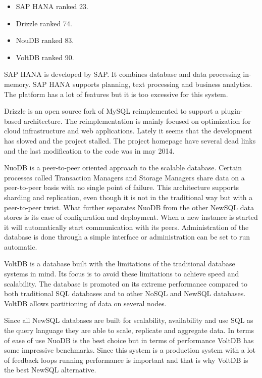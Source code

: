 \begin{itemize}
\item SAP HANA\cite{saphana} ranked 23.
\item Drizzle\cite{drizzle} ranked 74.
\item NouDB\cite{nuodb} ranked 83.
\item VoltDB\cite{voltdb} ranked 90.
\end{itemize}

SAP HANA is developed by SAP.
It combines database and data processing in-memory.
SAP HANA supports planning, text processing and business analytics.
The platform has a lot of features but it is too excessive for this system.

Drizzle is an open source fork of MySQL reimplemented to support a plugin-based architecture.
The reimplementation is mainly focused on optimization for cloud infrastructure and web applications.
Lately it seems that the development has slowed and the project stalled.
The project homepage have several dead links and the last modification to the code was in may 2014.

NuoDB is a peer-to-peer oriented approach to the scalable database. Certain processes called Transaction Managers and Storage Managers share data on a peer-to-peer basis with no single point of failure.
This architecture supports sharding and replication, even though it is not in the traditional way but with a peer-to-peer twist.
What further separates NuoDB from the other NewSQL data stores is its ease of configuration and deployment. When a new instance is started it will automatically start communication with its peers. Administration of the database is done through a simple interface or administration can be set to run automatic.

VoltDB is a database built with the limitations of the traditional database systems in mind. Its focus is to avoid these limitations to achieve speed and scalability. The database is promoted on its extreme performance  compared to both traditional SQL databases and to other NoSQL and NewSQL databases. VoltDB allows partitioning of data on several nodes.

Since all NewSQL databases are built for scalability, availability and use SQL as the query language they are able to scale, replicate and aggregate data.
In terms of ease of use NuoDB is the best choice but in terms of performance VoltDB has some impressive benchmarks.
Since this system is a production system with a lot of feedback loops running performance is important and that is why VoltDB is the best NewSQL alternative.

